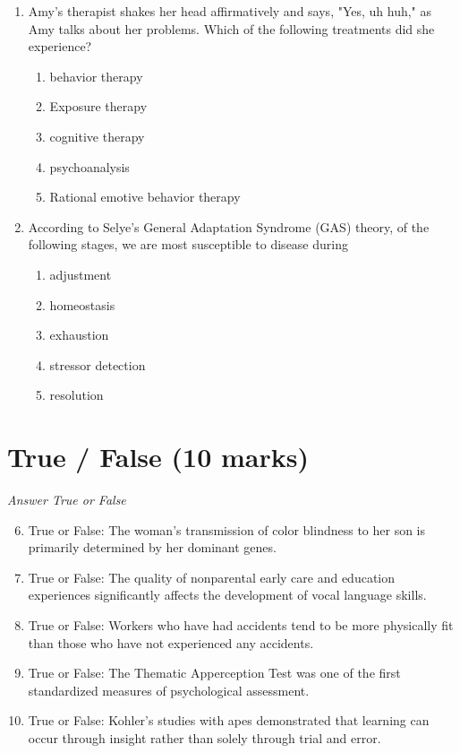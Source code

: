 \documentclass[12pt]{article}
\begin{document}
\begin{enumerate}[label=\arabic*.]
\begin{enumerate}[label=(\alph*)]
    \item III only
\end{enumerate}
\item Amy's therapist shakes her head affirmatively and says, "Yes, uh huh," as Amy talks about her problems. Which of the following treatments did she experience?
\begin{enumerate}[label=(\alph*)]
    \item behavior therapy
    \item Exposure therapy
    \item cognitive therapy
    \item psychoanalysis
    \item Rational emotive behavior therapy
\end{enumerate}
\item According to Selye's General Adaptation Syndrome (GAS) theory, of the following stages, we are most susceptible to disease during
\begin{enumerate}[label=(\alph*)]
    \item adjustment
    \item homeostasis
    \item exhaustion
    \item stressor detection
    \item resolution
\end{enumerate}
\end{enumerate}

\section*{True / False (10 marks)}
\textit{Answer True or False}
\begin{enumerate}[label=\arabic*.]
\setcounter{enumi}{5}
\item True or False: The woman's transmission of color blindness to her son is primarily determined by her dominant genes.
\item True or False: The quality of nonparental early care and education experiences significantly affects the development of vocal language skills.
\item True or False: Workers who have had accidents tend to be more physically fit than those who have not experienced any accidents.
\item True or False: The Thematic Apperception Test was one of the first standardized measures of psychological assessment.
\item True or False: Kohler's studies with apes demonstrated that learning can occur through insight rather than solely through trial and error.
\end{enumerate}
\end{document}
